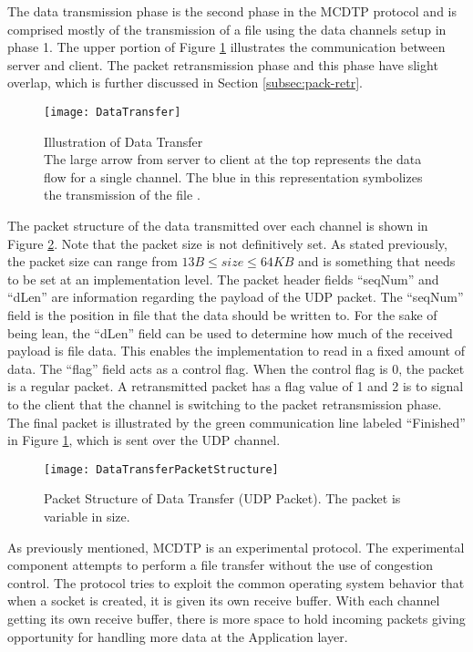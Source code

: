 The data transmission phase is the second phase in the MCDTP protocol and is comprised mostly of the transmission of a file using the data channels setup in phase 1. The upper portion of Figure \ref{fig:data-tr} illustrates the communication between server and client. The packet retransmission phase and this phase have slight overlap, which is further discussed in Section \ref{subsec:pack-retr}.

\begin{figure}[ht]
\centering
\texttt{[image: DataTransfer]}
\caption{Illustration of Data Transfer\\
The large arrow from server to client at the top represents the data flow for a single channel. The blue in this representation symbolizes the transmission of the file \cite{Meiss2007,He2002,gu2007udt,Fan2010,Aspera2016}.}
\label{fig:data-tr}
\end{figure}

The packet structure of the data transmitted over each channel is shown in Figure \ref{fig:data-tr-struct}. Note that the packet size is not definitively set. As stated previously, the packet size can range from $13B \leq size \leq 64KB$ and is something that needs to be set at an implementation level. The packet header fields ``seqNum'' and ``dLen'' are information regarding the payload of the UDP packet. The ``seqNum'' field is the position in file that the data should be written to. For the sake of being lean, the ``dLen'' field can be used to determine how much of the received payload is file data. This enables the implementation to read in a fixed amount of data. The ``flag'' field acts as a control flag. When the control flag is 0, the packet is a regular packet. A retransmitted packet has a flag value of 1 and 2 is to signal to the client that the channel is switching to the packet retransmission phase. The final packet is illustrated by the green communication line labeled ``Finished'' in Figure \ref{fig:data-tr}, which is sent over the UDP channel.

\begin{figure}[ht]
\centering
\texttt{[image: DataTransferPacketStructure]}
\caption{Packet Structure of Data Transfer (UDP Packet). The packet is variable in size.}
\label{fig:data-tr-struct}
\end{figure}

As previously mentioned, MCDTP is an experimental protocol. The experimental component attempts to perform a file transfer without the use of congestion control. The protocol tries to exploit the common operating system behavior that when a socket is created, it is given its own receive buffer. With each channel getting its own receive buffer, there is more space to hold incoming packets giving opportunity for handling more data at the Application layer.

